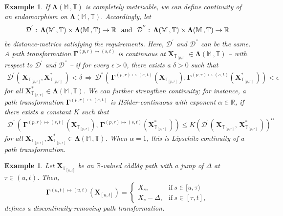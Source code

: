 \documentclass[12pt,a4paper]{article}
\newtheorem{ex}[thm]{Example}
\newcommand{\cadlag}{{c\`adl\`ag }}
\def\R{\mathbb{R}}
\def\M{\mathbb{M}}
\def\T{\mathbb{T}}
\begin{document}
\begin{ex}
\emph{If $\boldsymbol{\Lambda}(\M \,, \T)$ is completely metrizable, we can define continuity of an endomorphism on $\boldsymbol{\Lambda}(\M \,, \T)$. Accordingly, let
\begin{align}
\mathcal{D}^{'}: \, \boldsymbol{\Lambda}(\M \,, \T) \times \boldsymbol{\Lambda}(\M \,, \T) \rightarrow \R \hspace{0.1in} \text{and} \hspace{0.1in}
\mathcal{D}^{''}: \, \boldsymbol{\Lambda}(\M \,, \T) \times \boldsymbol{\Lambda}(\M \,, \T) \rightarrow \R
\end{align}
be distance-metrics satisfying the requirements. Here, $\mathcal{D}^{'}$ and $\mathcal{D}^{''}$ can be the same. A path transformation $\boldsymbol{\Gamma}^{(p,r)\mapsto(s,t)}$ is continuous at $\boldsymbol{X}_{\T_{[p,r]}}\in\boldsymbol{\Lambda}(\M \,, \T)$ -- with respect to $\mathcal{D}^{'}$ and $\mathcal{D}^{''}$ -- if for every $\epsilon > 0$, there exists a $\delta > 0$ such that
\begin{align}
\mathcal{D}^{'}\left(\, \boldsymbol{X}_{\T_{[p,r]}}, \boldsymbol{X}^{*}_{\T_{[p,r]}}\, \right) < \delta \, \Rightarrow \, \mathcal{D}^{''}\left(\, \boldsymbol{\Gamma}^{(p,r)\mapsto(s,t)}\left(\boldsymbol{X}_{\T_{[p,r]}}\right), \boldsymbol{\Gamma}^{(p,r)\mapsto(s,t)}\left(\boldsymbol{X}^{*}_{\T_{[p,r]}}\,\right) \right) <\epsilon 
\end{align}
for all $\boldsymbol{X}^{*}_{\T_{[p,r]}}\in\boldsymbol{\Lambda}(\M \,, \T)$. We can further strengthen continuity; for instance, a path transformation $\boldsymbol{\Gamma}^{(p,r)\mapsto(s,t)}$ is H\"older-continuous with exponent $\alpha\in\R$, if there exists a constant $K$ such that
\begin{align}
\mathcal{D}^{''}\left(\, \boldsymbol{\Gamma}^{(p,r)\mapsto(s,t)}\left(\boldsymbol{X}_{\T_{[p,r]}}\right),\, \boldsymbol{\Gamma}^{(p,r)\mapsto(s,t)}\left(\boldsymbol{X}^{*}_{\T_{[p,r]}}\,\right) \right) \leq K \left(\mathcal{D}^{'}\left(\, \boldsymbol{X}_{\T_{[p,r]}}, \, \boldsymbol{X}^{*}_{\T_{[p,r]}}\, \right)\right)^{\alpha} 
\end{align}
for all $\boldsymbol{X}_{\T_{[p,r]}},\boldsymbol{X}^{*}_{\T_{[p,r]}}\in\boldsymbol{\Lambda}(\M \,, \T)$. When $\alpha=1$, this is Lipschitz-continuity of a path transformation.}
\end{ex}
\begin{ex}
\emph{
Let $\boldsymbol{X}_{\T_{[u,t]}}$ be an $\R$-valued \cadlag path with a jump of $\Delta$ at $\tau\in(u,t)$. Then, 
\begin{equation}
    \boldsymbol{\Gamma}^{(u,t)\mapsto(u,t)}\left(\boldsymbol{X}_{[u,t]}\right) =
\begin{cases}
			X_s, & \text{if}\ s\in [u,\tau) \\
      X_{s} - \Delta, & \text{if}\ s\in[\tau,t],
\end{cases}
\end{equation}
defines a discontinuity-removing path transformation.}
\end{ex}
\end{document}
